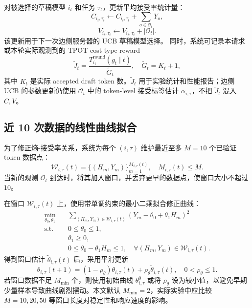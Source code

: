 \documentclass[11pt,a4paper]{ctexart}
\begin{document}
对被选择的草稿模型 $i_t$ 和任务 $\tau_t$，更新平均接受率统计量：
\begin{equation}
    C_{i_t,\tau_t}
    \leftarrow
    C_{i_t,\tau_t}
    +
    \sum_{o\in\mathcal{O}_t}Y_o,
    \label{eq:C_update}
\end{equation}
\begin{equation}
    V_{i_t,\tau_t}
    \leftarrow
    V_{i_t,\tau_t}
    +
    |\mathcal{O}_t|.
    \label{eq:V_update}
\end{equation}
该更新用于下一次边侧服务器的 UCB 草稿模型选择。
同时，系统可记录本请求或本轮实际观测到的 TPOT cost-type reward
\begin{equation}
    \widetilde{J}_t
    =
    \frac{
    T_{i_t}^{\mathrm{round}}(g_t\mid t)
    }{
    \widetilde{G}_t
    },
    \quad
    \widetilde{G}_t=K_t+1,
    \label{eq:observed_tpot}
\end{equation}
其中 $K_t$ 是实际 accepted draft token 数。$\widetilde{J}_t$ 用于实验统计和性能报告；边侧 UCB 的参数更新仍使用 $\mathcal{O}_t$ 中的 token-level 接受标签估计 $\alpha_{i,\tau}$，不把 $\widetilde{J}_t$ 混入 $C,V$。

\subsection{近 10 次数据的线性曲线拟合}
\label{subsec:curve_update}

为了修正熵-接受率关系，系统为每个 $(i,\tau)$ 维护最近至多 $M=10$ 个已验证 token 数据点：
\begin{equation}
    \mathcal{W}_{i,\tau}(t)
    =
    \{(H_m,Y_m)\}_{m=1}^{M_{i,\tau}(t)},
    \quad
    M_{i,\tau}(t)\leq M.
\end{equation}
当新的观测 $\mathcal{O}_t$ 到达时，将其加入窗口，并丢弃更早的数据点，使窗口大小不超过 $10$。

在窗口 $\mathcal{W}_{i,\tau}(t)$ 上，使用带单调约束的最小二乘拟合修正曲线：
\begin{subequations}
\label{prob:window_fit}
\begin{align}
    \min_{\theta_0,\theta_1}\quad
    &
    \sum_{(H_m,Y_m)\in\mathcal{W}_{i,\tau}(t)}
    \left(
    Y_m-\theta_0+\theta_1H_m
    \right)^2
    \\
    \mathrm{s.t.}\quad
    &
    0\leq \theta_0\leq 1,
    \\
    &
    \theta_1\geq 0,
    \\
    &
    0\leq \theta_0-\theta_1H_m\leq 1,
    \quad \forall (H_m,Y_m)\in\mathcal{W}_{i,\tau}(t).
\end{align}
\end{subequations}
得到窗口估计 $\widetilde{\theta}_{i,\tau}(t)$ 后，采用平滑更新
\begin{equation}
    \theta_{i,\tau}(t+1)
    =
    (1-\rho_\theta)\theta_{i,\tau}(t)
    +
    \rho_\theta\widetilde{\theta}_{i,\tau}(t),
    \quad
    0<\rho_\theta\leq 1.
    \label{eq:theta_smoothing}
\end{equation}
若窗口数据不足 $M_{\min}$ 个，则使用初始曲线 $\theta_{i,\tau}^{0}$ 或将 $\rho_\theta$ 设为较小值，以避免早期少量样本导致曲线剧烈摆动。本文默认 $M_{\min}=2$，实际实验中应比较 $M=10,20,50$ 等窗口长度对稳定性和响应速度的影响。
\end{document}
